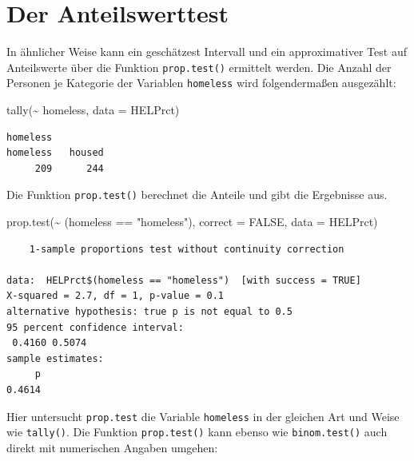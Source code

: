 \documentclass[
  ngerman,
]{scrbook}
\newenvironment{Shaded}{\begin{snugshade}}{\end{snugshade}}
\newcommand{\AttributeTok}[1]{\textcolor[rgb]{0.77,0.63,0.00}{#1}}
\newcommand{\ConstantTok}[1]{\textcolor[rgb]{0.00,0.00,0.00}{#1}}
\newcommand{\FunctionTok}[1]{\textcolor[rgb]{0.00,0.00,0.00}{#1}}
\newcommand{\NormalTok}[1]{#1}
\newcommand{\SpecialCharTok}[1]{\textcolor[rgb]{0.00,0.00,0.00}{#1}}
\newcommand{\StringTok}[1]{\textcolor[rgb]{0.31,0.60,0.02}{#1}}
\begin{document}
\hypertarget{der-anteilswerttest}{%
\section{Der Anteilswerttest}\label{der-anteilswerttest}}

In ähnlicher Weise kann ein geschätzest Intervall und ein approximativer Test auf Anteilswerte über die Funktion \texttt{prop.test()} ermittelt werden. Die Anzahl der Personen je Kategorie der Variablen \texttt{homeless} wird folgendermaßen ausgezählt:

\begin{Shaded}
\begin{Highlighting}[]
\FunctionTok{tally}\NormalTok{(}\SpecialCharTok{\textasciitilde{}}\NormalTok{ homeless, }\AttributeTok{data =}\NormalTok{ HELPrct)}
\end{Highlighting}
\end{Shaded}

\begin{verbatim}
homeless
homeless   housed 
     209      244 
\end{verbatim}

Die Funktion \texttt{prop.test()} berechnet die Anteile und gibt die Ergebnisse aus.

\begin{Shaded}
\begin{Highlighting}[]
\FunctionTok{prop.test}\NormalTok{(}\SpecialCharTok{\textasciitilde{}}\NormalTok{ (homeless }\SpecialCharTok{==} \StringTok{"homeless"}\NormalTok{), }
          \AttributeTok{correct =} \ConstantTok{FALSE}\NormalTok{, }\AttributeTok{data =}\NormalTok{ HELPrct)}
\end{Highlighting}
\end{Shaded}

\begin{verbatim}
    1-sample proportions test without continuity correction

data:  HELPrct$(homeless == "homeless")  [with success = TRUE]
X-squared = 2.7, df = 1, p-value = 0.1
alternative hypothesis: true p is not equal to 0.5
95 percent confidence interval:
 0.4160 0.5074
sample estimates:
     p 
0.4614 
\end{verbatim}

Hier untersucht \texttt{prop.test} die Variable \texttt{homeless} in der gleichen Art und Weise wie \texttt{tally()}. Die Funktion \texttt{prop.test()} kann ebenso wie \texttt{binom.test()} auch direkt mit numerischen Angaben umgehen:
\end{document}
